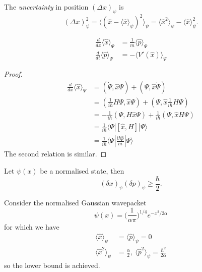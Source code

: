 \documentclass[a4paper]{article}
\theoremstyle{definition}
\begin{document}
\begin{eg}
\begin{itemize}
\end{itemize}
\end{eg}

\begin{definition}[Uncertainty]
  The \emph{uncertainty} in position \((\Delta x)_\psi\) is
  \[
(\Delta x)_\psi^2 = \langle (\hat x - \langle \hat x \rangle_\psi)^2\rangle_\psi = \langle \hat x^2 \rangle_\psi - \langle \hat x\rangle_\psi^2.
  \]
\end{definition}

\begin{theorem}
  \begin{align*}
    \frac{d}{dx} \langle \hat x\rangle_\Psi &= \frac{1}{m} \langle \hat p\rangle_\Psi \\
    \frac{d}{dt}\langle \hat p\rangle_\Psi &= - \langle V'(\hat x)\rangle_\Psi
  \end{align*}
\end{theorem}

\begin{proof}
  \begin{align*}
    \frac{d}{dx}\langle\hat x\rangle_\Psi &= (\dot\Psi, \hat x \Psi) + (\Psi,\hat x\dot\Psi) \\
                                          &= (\frac{1}{i\hbar}H\Psi,\hat x\Psi) + (\Psi, \hat x \frac{1}{i\hbar}H\Psi) \\
                                          &= -\frac{1}{i\hbar}(\Psi,H\hat x\Psi) + \frac{1}{i\hbar}(\Psi, \hat x H \Psi) \\
                                          &= \frac{1}{i\hbar} \langle\Psi|[\hat x, H]|\Psi\rangle \\
                                          &= \frac{1}{i\hbar} \langle\Psi| \frac{i\hbar\hat p}{m}|\Psi\rangle
  \end{align*}
  The second relation is similar.
\end{proof}

\begin{theorem}
  Let \(\psi(x)\) be a normalised state, then
  \[
(\delta x)_\psi (\delta p)_\psi \geq \frac{\hbar}{2}.
  \]
\end{theorem}

\begin{eg}
  Consider the normalised Gaussian wavepacket
  \[
    \psi(x) = \Big( \frac{1}{\alpha\pi} \Big)^{1/4} e^{-x^2/2\alpha}
  \]
  for which we have
  \begin{align*}
    \langle\hat x\rangle_\psi &= \langle\hat p\rangle_\psi = 0 \\
    \langle\hat x^2\rangle_\psi &= \frac{\alpha}{2} ,\: \langle\hat p^2\rangle_\psi = \frac{\hbar^2}{2\alpha}
  \end{align*}
  so the lower bound is achieved.
\end{eg}
\end{document}
